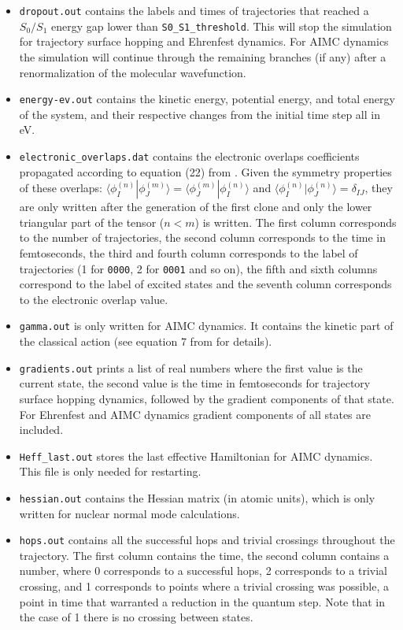 \begin{itemize}
\item \verb+dropout.out+ contains the labels and times of trajectories that reached a $S_0/S_1$ energy gap lower than \verb+S0_S1_threshold+. This will stop the simulation for trajectory surface hopping and Ehrenfest dynamics. For AIMC dynamics the simulation will continue through the remaining branches (if any) after a renormalization of the molecular wavefunction.
\item \verb+energy-ev.out+ contains the kinetic energy, potential energy, and total energy of the system, and their respective changes  from the initial time step all in eV.
\item \verb+electronic_overlaps.dat+ contains the electronic overlaps coefficients propagated according to equation (22) from \cite{freixas2018ab}. Given the symmetry properties of these overlaps: $\langle\phi_I^{(n)}|\phi_J^{(m)}\rangle=\langle\phi_J^{(m)}|\phi_I^{(n)}\rangle$ and $\langle\phi_I^{(n)}|\phi_J^{(n)}\rangle=\delta_{IJ}$, they are only written after the generation of the first clone and only the lower triangular part of the tensor ($n < m$) is written. The first column corresponds to the number of trajectories, the second column corresponds to the time in femtoseconds, the third and fourth column corresponds to the label of trajectories (1 for \verb+0000+, 2 for \verb+0001+ and so on), the fifth and sixth columns correspond to the label of excited states and the seventh column corresponds to the electronic overlap value.
\item \verb+gamma.out+ is only written for AIMC dynamics. It contains the kinetic part of the classical action (see equation 7 from \cite{freixas2018ab} for details).
\item \verb+gradients.out+ prints a list of real numbers where the first value is the current state, the second value is the time in femtoseconds for trajectory surface hopping dynamics, followed by the gradient components of that state. For Ehrenfest and AIMC dynamics gradient components of all states are included. 
\item \verb+Heff_last.out+ stores the last effective Hamiltonian for AIMC dynamics. This file is only needed for restarting.
\item \verb+hessian.out+ contains the Hessian matrix (in atomic units), which is only written for nuclear normal mode calculations.
\item \verb+hops.out+ contains all the successful hops and trivial crossings throughout the trajectory.  The first column contains the time, the second column contains a number, where 0 corresponds to a successful hops, 2 corresponds to a trivial crossing, and 1 corresponds to points where a trivial crossing was possible, a point in time that warranted a reduction in the quantum step. Note that in the case of 1 there is no crossing between states.

\end{itemize}
